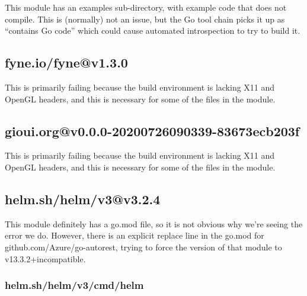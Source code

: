 \documentclass[a4paper]{paper}
\begin{document}
This module has an examples sub-directory, with example code that does
not compile. This is (normally) not an issue, but the Go tool chain
picks it up as ``contains Go code'' which could cause automated
introspection to try to build it.

\subsection{fyne.io/fyne@v1.3.0}

This is primarily failing because the build environment is lacking X11
and OpenGL headers, and this is necessary for some of the files in the
module.

\subsection{gioui.org@v0.0.0-20200726090339-83673ecb203f}

This is primarily failing because the build environment is lacking X11
and OpenGL headers, and this is necessary for some of the files in the
module.


\subsection{helm.sh/helm/v3@v3.2.4}

This module definitely has a go.mod file, so it is not obvious why we're seeing the error we do. However, there is an explicit replace line in the go.mod for github.com/Azure/go-autorest, trying to force the version of that module to v13.3.2+incompatible. 

\subsubsection{helm.sh/helm/v3/cmd/helm}
\end{document}
